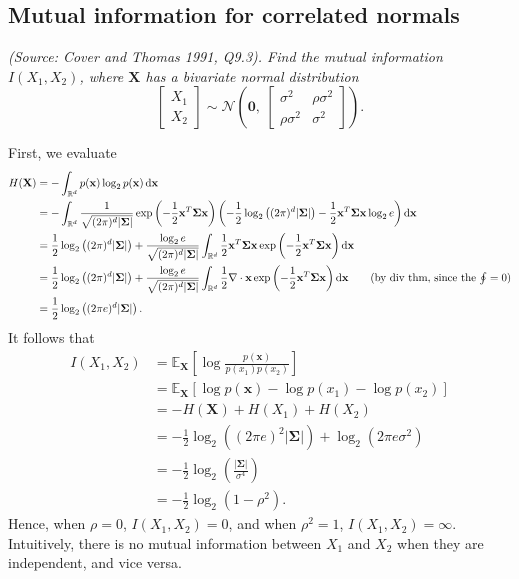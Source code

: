 \subsection{Mutual information for correlated normals}
\textit{(Source: Cover and Thomas 1991, Q9.3). Find the mutual information $I(X_1, X_2)$, where $\mathbf{X}$ has a bivariate normal distribution}
\begin{equation*}
\begin{bmatrix}X_1\\X_2\end{bmatrix} \sim \mathcal{N}\left(\mathbf{0},\ \begin{bmatrix}\sigma^2&\rho\sigma^2\\\rho\sigma^2&\sigma^2\end{bmatrix}\right).
\end{equation*}

First, we evaluate
\begin{align*}
H(\mathbf{X}) &= -\int_{\mathbb{R}^d} p(\mathbf{x})\log_2p(\mathbf{x}) \mathop{}\!\mathrm{d} \mathbf{x}\\
&= -\int_{\mathbb{R}^d} \frac{1}{\sqrt{(2\pi)^d|\mathbf{\Sigma}|}} \exp\left(-\frac{1}{2}\mathbf{x}^T\mathbf{\Sigma}\mathbf{x}\right) \left(-\frac{1}{2}\log_2\left((2\pi)^d|\mathbf{\Sigma}|\right)-\frac{1}{2}\mathbf{x}^T\mathbf{\Sigma}\mathbf{x}\log_2e\right) \mathop{}\!\mathrm{d} \mathbf{x}\\
&= \frac{1}{2}\log_2\left((2\pi)^d|\mathbf{\Sigma}|\right) + \frac{\log_2e}{\sqrt{(2\pi)^d|\mathbf{\Sigma}|}} \int_{\mathbb{R}^d} \frac{1}{2}\mathbf{x}^T\mathbf{\Sigma}\mathbf{x} \exp\left(-\frac{1}{2}\mathbf{x}^T\mathbf{\Sigma}\mathbf{x}\right) \mathop{}\!\mathrm{d} \mathbf{x}\\
&= \frac{1}{2}\log_2\left((2\pi)^d|\mathbf{\Sigma}|\right) + \frac{\log_2e}{\sqrt{(2\pi)^d|\mathbf{\Sigma}|}} \int_{\mathbb{R}^d} \frac{1}{2}\nabla\cdot\mathbf{x} \exp\left(-\frac{1}{2}\mathbf{x}^T\mathbf{\Sigma}\mathbf{x}\right) \mathop{}\!\mathrm{d} \mathbf{x} \tag{by div thm, since the $\oint=0$}\\
&= \frac{1}{2}\log_2\left((2\pi e)^d|\mathbf{\Sigma}|\right).
\end{align*}
It follows that
\begin{align*}
I(X_1, X_2) &= \mathbb{E}_{\mathbf{X}}\left[ \log\frac{p(\mathbf{x})}{p(x_1)p(x_2)} \right]\\
&= \mathbb{E}_{\mathbf{X}}[\log{p(\mathbf{x})} - \log{p(x_1)} - \log{p(x_2)}]\\
&= -H(\mathbf{X}) + H(X_1) + H(X_2)\\
&= -\frac{1}{2}\log_2\left((2\pi e)^2|\mathbf\Sigma|\right) + \log_2\left(2\pi e\sigma^2\right)\\
&= -\frac{1}{2}\log_2\left(\frac{|\mathbf\Sigma|}{\sigma^4}\right)\\
&= -\frac{1}{2}\log_2(1-\rho^2).
\end{align*}
Hence, when $\rho = 0$, $I(X_1,X_2) = 0$, and when $\rho^2 = 1$, $I(X_1,X_2) = \infty$. Intuitively, there is no mutual information between $X_1$ and $X_2$ when they are independent, and vice versa.

